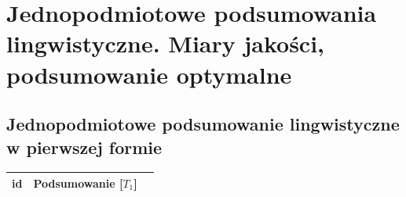 \documentclass{classrep}
\begin{document}


\section{ Jednopodmiotowe podsumowania lingwistyczne. Miary jakości, podsumowanie optymalne}

\subsection{Jednopodmiotowe podsumowanie lingwistyczne w pierwszej formie}


\begin{center}
  \begin{table}[H]
    \begin{tabularx}{\textwidth}{lXc}
    
    id & Podsumowanie [$T_1$] \\ \hline 
  
    

\end{tabularx}
\end{table}
\end{center}
\end{document}
